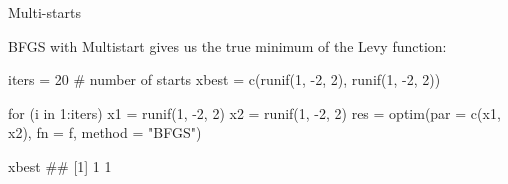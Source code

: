 \documentclass[11pt,compress,t,notes=noshow, xcolor=table]{beamer}
\begin{document}
\begin{vbframe}{Multi-starts}
\framebreak

BFGS with Multistart gives us the true minimum of the Levy function:\\
\lz

\footnotesize
\begin{verbbox}
iters = 20 # number of starts
xbest = c(runif(1, -2, 2), runif(1, -2, 2))
\end{verbbox}
\theverbbox


\vspace{0.4cm}
\begin{verbbox}
for (i in 1:iters) {
x1 = runif(1, -2, 2)
x2 = runif(1, -2, 2)
res = optim(par = c(x1, x2), fn = f, method = "BFGS")
}
\end{verbbox}
\theverbbox

\vspace{0.4cm}
\theverbbox

\vspace{0.4cm}
\begin{verbbox}
xbest
## [1] 1 1
\end{verbbox}
\theverbbox





\end{vbframe}



\endlecture
\end{document}
